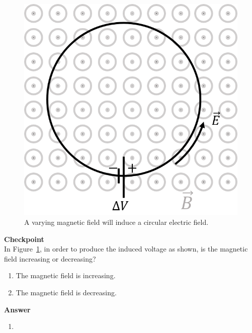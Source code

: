 \begin{figure}[!htbp]
\centering
\includegraphics[width=0.4\linewidth]{files/inducedE-7bdece303343897b313b1edc5e6f97b8.png}
\caption[]{A varying magnetic field will induce a circular electric field.}
\label{fig:induction:inducedE}
\end{figure}

\begin{framed}
\textbf{Checkpoint}\\
In Figure~\ref{fig:induction:inducedE}, in order to produce the induced voltage as shown, is the magnetic field increasing or decreasing?

\begin{enumerate}
\item The magnetic field is increasing.
\item The magnetic field is decreasing.
\end{enumerate}

\begin{framed}
\textbf{Answer}\\
\begin{enumerate}[resume]
\item
\end{enumerate}
\end{framed}
\end{framed}

